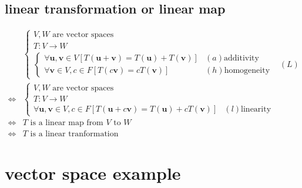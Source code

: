 \documentclass[
]{book}
\theoremstyle{definition}
\theoremstyle{definition}
\theoremstyle{definition}
\theoremstyle{definition}
\theoremstyle{remark}
\begin{document}
\hypertarget{linear-transformation-or-linear-map}{%
\subsection{linear transformation or linear map}\label{linear-transformation-or-linear-map}}

\[
\begin{aligned}
 & \begin{cases}
V,W\text{ are vector spaces}\\
T:V\rightarrow W\\
\begin{cases}
\forall\boldsymbol{u},\boldsymbol{v}\in V\left[T\left(\boldsymbol{u}+\boldsymbol{v}\right)=T\left(\boldsymbol{u}\right)+T\left(\boldsymbol{v}\right)\right] & \left(a\right)\text{additivity}\\
\forall\boldsymbol{v}\in V,c\in F\left[T\left(c\boldsymbol{v}\right)=cT\left(\boldsymbol{v}\right)\right] & \left(h\right)\text{homogeneity}
\end{cases} & \left(L\right)
\end{cases}\\
\Leftrightarrow & \begin{cases}
V,W\text{ are vector spaces}\\
T:V\rightarrow W\\
\forall\boldsymbol{u},\boldsymbol{v}\in V,c\in F\left[T\left(\boldsymbol{u}+c\boldsymbol{v}\right)=T\left(\boldsymbol{u}\right)+cT\left(\boldsymbol{v}\right)\right] & \left(l\right)\text{linearity}
\end{cases}\\
\Leftrightarrow & T\text{ is a linear map from }V\text{ to }W\\
\Leftrightarrow & T\text{ is a linear tranformation}
\end{aligned}
\]

\hypertarget{vector-space-example}{%
\section{vector space example}\label{vector-space-example}}
\end{document}

